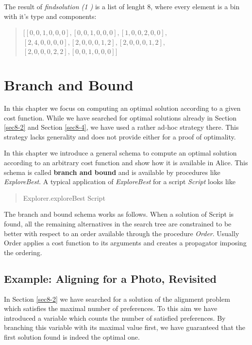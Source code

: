 \documentclass[a4paper,halfparskip]{scrartcl}
\begin{document}
 
The result of \emph{findsolution (1 )}
is a list of lenght 8, where every element is a bin with it's type
and components:
\begin{quote}
$[[0, 0, 1, 0, 0, 0], [0, 0, 1, 0, 0, 0], [1, 0, 0, 2, 0, 0],$\\
$[2, 4, 0, 0, 0, 0], [2, 0, 0, 0, 1, 2], [2, 0, 0, 0, 1, 2],$\\
$[2, 0, 0, 0, 2, 2], [0, 0, 1, 0, 0, 0]]$
\end{quote}






\newpage
\section{Branch and Bound}
In this chapter we focus on computing an optimal solution 
according to a given cost function. While we have searched 
for optimal solutions already in Section \ref{sec8-2} and Section 
\ref{sec8-4}, we have used a rather ad-hoc strategy there. This strategy 
lacks generality and does not provide either for a proof of optimality.

In this chapter we introduce a general schema to compute an optimal 
solution according to an arbitrary cost function and show how it is 
available in Alice. This schema is called \textbf{branch and bound} and is available 
by procedures like \emph{ExploreBest}. A typical application of \emph{ExploreBest}
for a script \emph{Script} looks like
\begin{quote}
    Explorer.exploreBest Script 
\end{quote}
The branch and bound schema works as follows. When a solution of 
Script is found, all the remaining alternatives in the search tree 
are constrained to be better with respect to an order available through 
the procedure \emph{Order}. Usually Order applies a cost function to its 
arguments and creates a propagator imposing the ordering.  




\subsection{Example: Aligning for a Photo, Revisited}
In Section \ref{sec8-2} we have searched for a solution of the 
alignment problem which satisfies the maximal number of preferences. 
To this aim we have introduced a variable which counts the number of 
satisfied preferences. By branching this variable with its maximal 
value first, we have guaranteed that the first solution found is 
indeed the optimal one.
\end{document}
